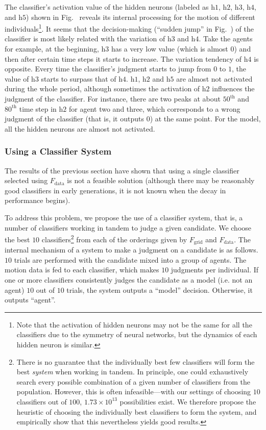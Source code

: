 The classifier's activation value of the hidden neurons (labeled as $\textrm{h}1$, $\textrm{h}2$, $\textrm{h}3$, $\textrm{h}4$, and $\textrm{h}5$) shown in Fig.~ reveals its internal processing for the motion of different individuals\footnote{Note that the activation of hidden neurons may not be the same for all the classifiers due to the symmetry of neural networks, but the dynamics of each hidden neuron is similar.}. It seems that the decision-making (``sudden jump'' in Fig.~) of the classifier is most likely related with the variation of $\textrm{h}3$ and $\textrm{h}4$. Take the agents for example, at the beginning, $\textrm{h}3$ has a very low value (which is almost $0$) and then after certain time steps it starts to increase. The variation tendency of $\textrm{h}4$ is opposite.  Every time the classifier's judgment starts to jump from $0$ to $1$, the value of $\textrm{h}3$ starts to surpass that of $\textrm{h}4$. $\textrm{h}1$, $\textrm{h}2$ and $\textrm{h}5$ are almost not activated during the whole period, although sometimes the activation of $\textrm{h}2$ influences the judgment of the classifier. For instance, there are two peaks at about $50^\textrm{th}$ and $80^\textrm{th}$ time step in $\textrm{h}2$ for agent two and three, which corresponds to a wrong judgment of the classifier (that is, it outputs $0$) at the same point. For the model, all the hidden neurons are almost not activated.

\subsubsection{Using a Classifier System}
The results of the previous section have shown that using a single classifier selected using $F_{\textrm{data}}$ is not a feasible solution (although there may be reasonably good classifiers in early generations, it is not known when the decay in performance begins).

To address this problem, we propose the use of a classifier system, that is, a number of classifiers working in tandem to judge a given candidate. We choose the best $10$ classifiers\footnote{
%
There is no guarantee that the individually best few classifiers will form the best \emph{system} when working in tandem. In principle, one could exhaustively search every possible combination of a given number of classifiers from the population. However, this is often infeasible---with our settings of choosing $10$ classifiers out of $100$, $1.73\times 10^{13}$ possibilities exist. We therefore propose the heuristic of choosing the individually best classifiers to form the system, and empirically show that this nevertheless yields good results.
%
} from each of the orderings given by $F_\textrm{grid}$ and $F_\textrm{data}$. The internal mechanism of a system to make a judgment on a candidate is as follows. $10$ trials are performed with the candidate mixed into a group of agents. The motion data is fed to each classifier, which makes $10$ judgments per individual. If one or more classifiers consistently judges the candidate as a model (i.e. not an agent) $10$ out of $10$ trials, the system outputs a ``model'' decision. Otherwise, it outputs ``agent''.

